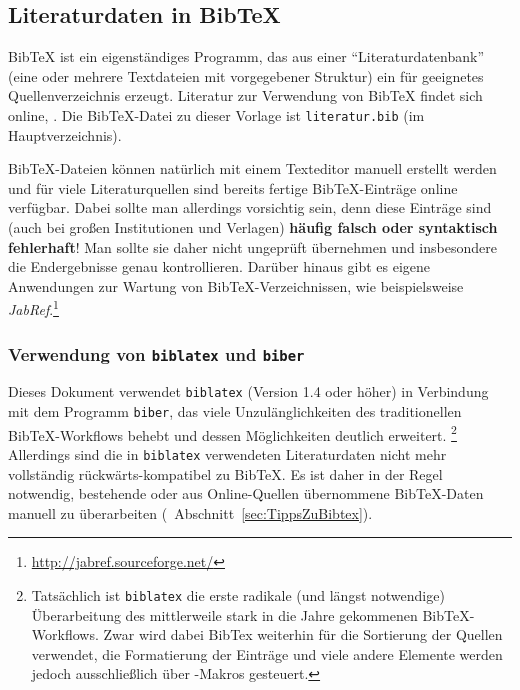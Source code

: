 \subsection{Literaturdaten in BibTeX}
\label{sec:bibtex}

BibTeX ist ein eigenständiges Programm, das aus einer "`Literaturdatenbank"' (eine oder mehrere
Textdateien mit vorgegebener Struktur) ein für \latex geeignetes Quellenverzeichnis
erzeugt. Literatur zur Verwendung von BibTeX findet sich online, \zB \cite{Feder2006, Patashnik1988}.
Die BibTeX-Datei zu dieser Vorlage ist \nolinkurl{literatur.bib} (im Hauptverzeichnis).

BibTeX-Dateien können natürlich mit einem Texteditor manuell erstellt werden und für
viele Literaturquellen sind bereits fertige BibTeX-Einträge online verfügbar.
Dabei sollte man allerdings vorsichtig sein, denn diese Einträge sind (auch bei großen
Institutionen und Verlagen) \textbf{häufig falsch oder syntaktisch fehlerhaft}!
Man sollte sie daher nicht ungeprüft übernehmen und insbesondere die Endergebnisse genau kontrollieren.
Darüber hinaus gibt es eigene Anwendungen zur Wartung von
BibTeX-Verzeichnissen, wie beispielsweise
\emph{JabRef}.\footnote{\url{http://jabref.sourceforge.net/}}


\subsubsection{Verwendung von \texttt{biblatex} und \texttt{biber}}

Dieses Dokument verwendet \texttt{biblatex} (Version 1.4 oder höher) in Verbindung
mit dem Programm \texttt{biber}, 
das viele Unzulänglichkeiten des traditionellen BibTeX-Work\-flows behebt und dessen Möglichkeiten deutlich erweitert.%
\footnote{Tatsächlich ist \texttt{biblatex} die erste radikale (und längst notwendige) Überarbeitung des mittlerweile stark in die Jahre gekommenen BibTeX-Workflows. Zwar wird dabei BibTex weiterhin für 
die Sortierung der Quellen verwendet, die Formatierung der Einträge und viele andere Elemente werden jedoch ausschließlich über \latex-Makros gesteuert.}
Allerdings sind die in \texttt{biblatex} verwendeten Literaturdaten nicht mehr vollständig 
rückwärts-kompatibel zu BibTeX. Es ist daher in der Regel notwendig, bestehende oder aus
Online-Quellen übernommene BibTeX-Daten manuell zu überarbeiten (\sa\ Abschnitt~\ref{sec:TippsZuBibtex}).

